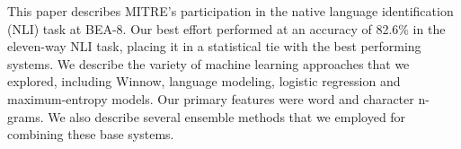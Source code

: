 This paper describes MITRE's participation in the native language identification (NLI) task at BEA-8. Our best effort performed at an accuracy of
 82.6\% in the eleven-way NLI task, placing it in a statistical tie with the best
 performing systems. We describe the variety of machine learning approaches that
 we explored, including Winnow, language modeling, logistic regression and
 maximum-entropy models. Our primary features were word and character n-grams.
 We also describe several ensemble methods that we employed for combining these
 base systems.

